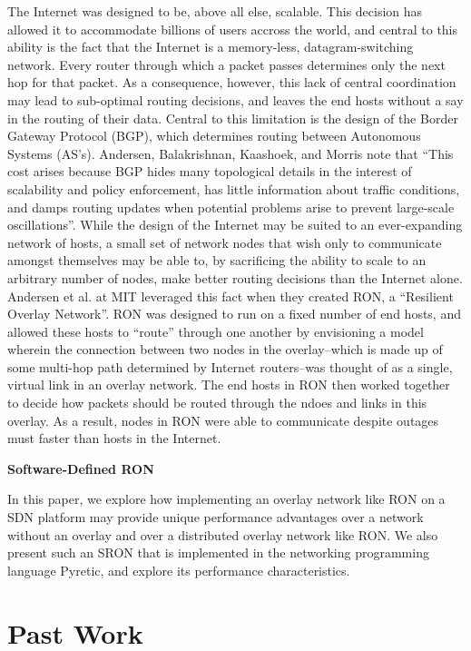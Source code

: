 \documentclass[pageno]{jpaper}
\begin{document}
The Internet was designed to be, above all else, scalable. This decision
has allowed it to accommodate billions of users accross the world, and central
to this ability is the fact that the Internet is a memory-less, datagram-switching
network. Every router through which a packet passes determines only the next
hop for that packet. As a consequence, however, this lack of central coordination
may lead to sub-optimal routing decisions, and leaves the end hosts without a 
say in the routing of their data.  Central to this limitation is the design of 
the Border Gateway Protocol (BGP), which determines routing between Autonomous
Systems (AS's).  Andersen, Balakrishnan, Kaashoek, and Morris note that 
``This cost arises because BGP hides many topological details in the interest of
scalability and policy enforcement, has little information about traffic conditions,
and damps routing updates when potential problems arise to prevent large-scale
oscillations''\cite{ron}.  
While the design of the Internet may be suited to an ever-expanding network 
of hosts, a small set of network nodes that wish only to communicate amongst
themselves may be able to, by sacrificing the ability to scale to an arbitrary
number of nodes, make better routing decisions than the Internet alone.
Andersen et al. at MIT leveraged this fact when they created RON, a 
``Resilient Overlay Network''. RON was designed to run on a fixed number of 
end hosts, and allowed these hosts to ``route'' through one another by envisioning
a model wherein the connection between two nodes in the overlay--which is made
up of some multi-hop path determined by Internet routers--was thought of as a
single, virtual link in an overlay network. The end hosts in RON then worked 
together to decide how packets should be routed through the ndoes and links in this
overlay. As a result, nodes in RON were able to communicate despite outages 
must faster than hosts in the Internet.\bigskip

{\bf Software-Defined RON}\bigskip

In this paper, we explore how implementing an overlay network like RON on a 
SDN platform may provide unique performance advantages over a network 
without an overlay and over a distributed overlay network like RON. We also
present such an SRON that is implemented in the networking programming language
Pyretic, and explore its performance characteristics.

\section{Past Work}
\end{document}
